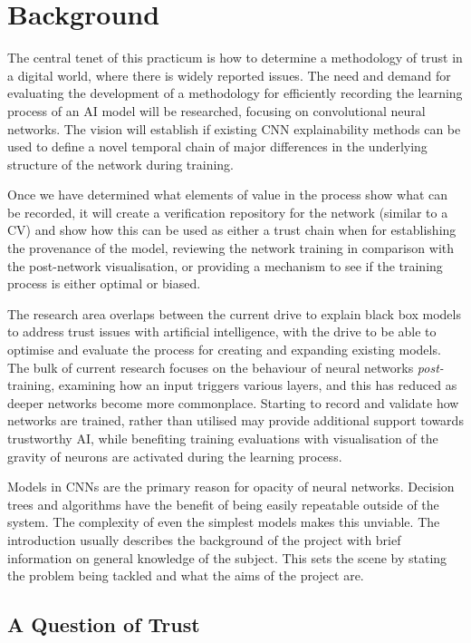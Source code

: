 \section{Background}

The central tenet of this practicum is how to determine a methodology of trust in a digital world, where there is widely reported issues. The need and demand for evaluating the development of a methodology for efficiently recording the learning process of an AI model will be researched, focusing on convolutional neural networks. The vision will establish if existing CNN explainability methods can be used to define a novel temporal chain of major differences in the underlying structure of the network during training.
 
Once we have determined what elements of value in the process show what can be recorded, it will create a verification repository for the network (similar to a CV) and show how this can be used as either a trust chain when for establishing the provenance of the model, reviewing the network training in comparison with the post-network visualisation, or providing a mechanism to see if the training process is either optimal or biased.

The research area overlaps between the current drive to explain black box models\cite{adadi_peeking_2018} to address trust issues with artificial intelligence\cite{ryan_ai_2020}, with the drive to be able to optimise and evaluate the process for creating and expanding existing models. The bulk of current research focuses on the behaviour of neural networks \textit{post-}training, examining how an input triggers various layers, and this has reduced as deeper networks become more commonplace. Starting to record and validate how networks are trained, rather than utilised may provide additional support towards trustworthy AI\cite{he_deep_2015}, while benefiting training evaluations with visualisation of the gravity of neurons are activated during the learning process.

Models in CNNs are the primary reason for opacity of neural networks. Decision trees and algorithms have the benefit of being easily repeatable outside of the system. The complexity of even the simplest models makes this unviable. The introduction usually describes the background of the project with brief information on general knowledge of the subject. This sets the scene by stating the problem being tackled and what the aims of the project are.

\subsection{A Question of Trust}

